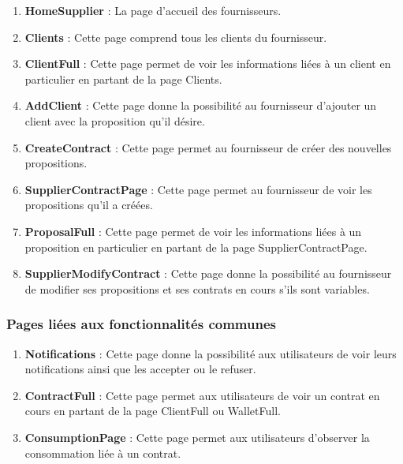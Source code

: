 \begin{enumerate}
\item \textbf{HomeSupplier} : \newline
La page d’accueil des fournisseurs.
\item \textbf{Clients} : \newline
Cette page comprend tous les clients du fournisseur.
\item \textbf{ClientFull} :  \newline
Cette page permet de voir les informations liées à un client en particulier en partant de la page Clients.
\item \textbf{AddClient} : \newline
Cette page donne la possibilité au fournisseur d’ajouter un client avec la proposition qu’il désire.
\item \textbf{CreateContract} :\newline
Cette page permet au fournisseur de créer  des nouvelles propositions.
\item \textbf{SupplierContractPage} :\newline
Cette page permet au fournisseur de voir les propositions qu’il a créées.
\item \textbf{ProposalFull} :\newline
Cette page permet de voir les informations liées à un proposition en particulier en partant de la page SupplierContractPage.
\item \textbf{SupplierModifyContract} :\newline
Cette page donne la possibilité au fournisseur de modifier ses propositions et ses contrats en cours s’ils sont variables.
\end{enumerate} 

\subsubsection{Pages liées aux fonctionnalités communes}
\begin{enumerate}
\item \textbf{Notifications} :\newline
Cette page donne la possibilité aux utilisateurs de voir leurs notifications ainsi que les accepter ou le refuser.
\item \textbf{ContractFull} :\newline
Cette page permet aux utilisateurs de voir un contrat en cours en partant de la page ClientFull ou WalletFull.
\item \textbf{ConsumptionPage} :\newline
Cette page permet aux utilisateurs d’observer la consommation liée à un contrat.
\end{enumerate} 

